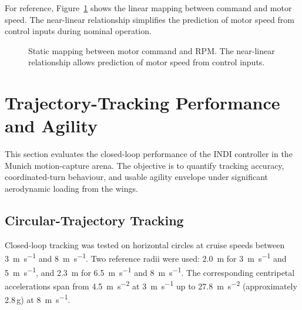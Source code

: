For reference, Figure~\ref{fig:rpm_vs_cmd} shows the linear mapping between command and motor speed. The near-linear relationship simplifies the prediction of motor speed from control inputs during nominal operation.

\begin{figure}[htbp]
  \centering
  \caption{Static mapping between motor command and RPM. The near-linear relationship allows prediction of motor speed from control inputs.}
  \label{fig:rpm_vs_cmd}
\end{figure}

\section{Trajectory-Tracking Performance and Agility}\label{sec:tracking-performance}

This section evaluates the closed-loop performance of the INDI controller in the Munich motion-capture arena.
The objective is to quantify tracking accuracy, coordinated-turn behaviour, and usable agility envelope under significant aerodynamic loading from the wings.

\subsection{Circular-Trajectory Tracking}\label{sec:circular-tracking}

Closed-loop tracking was tested on horizontal circles at cruise speeds between \SI{3}{\meter\per\second} and \SI{8}{\meter\per\second}.
Two reference radii were used: \SI{2.0}{\meter} for \SI{3}{\meter\per\second} and \SI{5}{\meter\per\second}, and \SI{2.3}{\meter} for \SI{6.5}{\meter\per\second} and \SI{8}{\meter\per\second}.
The corresponding centripetal accelerations span from \SI{4.5}{\meter\per\second\squared} at \SI{3}{\meter\per\second} up to \SI{27.8}{\meter\per\second\squared} (approximately 2.8\,g) at \SI{8}{\meter\per\second}.

